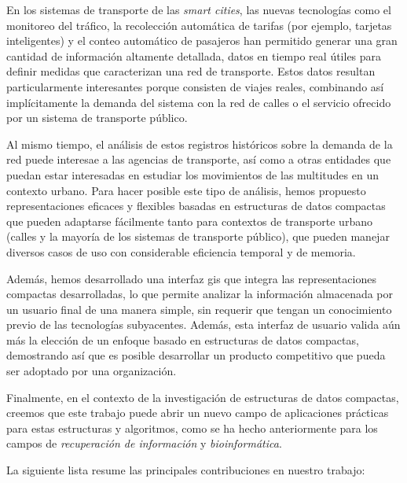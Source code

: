     En los sistemas de transporte de las \textit{smart cities}, las nuevas tecnolog\'ias como el monitoreo del tr\'afico, la recolecci\'on autom\'atica de tarifas (por ejemplo, tarjetas inteligentes) y el conteo autom\'atico de pasajeros han permitido generar una gran cantidad de informaci\'on altamente detallada, datos en tiempo real \'utiles para definir medidas que caracterizan una red de transporte. Estos datos resultan particularmente interesantes porque consisten de viajes reales, combinando as\'i impl\'icitamente la demanda del sistema con la red de calles o el servicio ofrecido por un sistema de transporte p\'ublico.

    Al mismo tiempo, el an\'alisis de estos registros hist\'oricos sobre la demanda de la red puede interesae a las agencias de transporte, as\'i como a otras entidades que puedan estar interesadas en estudiar los movimientos de las multitudes en un contexto urbano. Para hacer posible este tipo de an\'alisis, hemos propuesto representaciones eficaces y flexibles basadas en estructuras de datos compactas que pueden adaptarse f\'acilmente tanto para contextos de transporte urbano (calles y la mayor\'ia de los sistemas de transporte p\'ublico), que pueden manejar diversos casos de uso con considerable eficiencia temporal y de memoria.
    
    Adem\'as, hemos desarrollado una interfaz \gls{gis} que integra las representaciones compactas desarrolladas, lo que permite analizar la informaci\'on almacenada por un usuario final de una manera simple, sin requerir que tengan un conocimiento previo de las tecnolog\'ias subyacentes. Adem\'as, esta interfaz de usuario valida a\'un m\'as la elecci\'on de un enfoque basado en estructuras de datos compactas, demostrando as\'i que es posible desarrollar un producto competitivo que pueda ser adoptado por una organizaci\'on.
    
    Finalmente, en el contexto de la investigaci\'on de estructuras de datos compactas, creemos que este trabajo puede abrir un nuevo campo de aplicaciones pr\'acticas para estas estructuras y algoritmos, como se ha hecho anteriormente para los campos de \textit{recuperaci\'on de informaci\'on} y \textit{bioinform\'atica}.

    La siguiente lista resume las principales contribuciones en nuestro trabajo:

